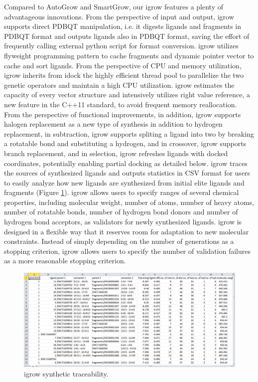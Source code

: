 Compared to AutoGrow and SmartGrow, our igrow features a plenty of advantageous innovations. From the perspective of input and output, igrow supports direct PDBQT manipulation, i.e. it digests ligands and fragments in PDBQT format and outputs ligands also in PDBQT format, saving the effort of frequently calling external python script for format conversion. igrow utilizes flyweight programming pattern to cache fragments and dynamic pointer vector to cache and sort ligands. From the perspective of CPU and memory utilization, igrow inherits from idock the highly efficient thread pool to parallelize the two genetic operators and maintain a high CPU utilization. igrow estimates the capacity of every vector structure and intensively utilizes right value reference, a new feature in the C++11 standard, to avoid frequent memory reallocation. From the perspective of functional improvements, in addition, igrow supports halogen replacement as a new type of synthesis in addition to hydrogen replacement, in subtraction, igrow supports spliting a ligand into two by breaking a rotatable bond and substituting a hydrogen, and in crossover, igrow supports branch replacement, and in selection, igrow refreshes ligands with docked coordinates, potentially enabling partial docking as detailed below. igrow traces the sources of synthesized ligands and outputs statistics in CSV format for users to easily analyze how new ligands are synthesized from initial elite ligands and fragments (Figure \ref{igrow:SyntheticTraceability}). igrow allows users to specify ranges of several chemical properties, including molecular weight, number of atoms, number of heavy atoms, number of rotatable bonds, number of hydrogen bond donors and number of hydrogen bond acceptors, as validators for newly synthesized ligands. igrow is designed in a flexible way that it reserves room for adaptation to new molecular constraints. Instead of simply depending on the number of generations as a stopping criterion, igrow allows users to specify the number of validation failures as a more reasonable stopping criterion.

\begin{figure}
\centering
\includegraphics[width=\textwidth]{igrow/SyntheticTraceability.png}
\caption{igrow synthetic traceability.}
\label{igrow:SyntheticTraceability}
\end{figure}


